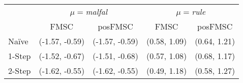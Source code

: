 \begin{tabular}{lcccc} 
 \hline \hline 
 & \multicolumn{2}{c}{\emph{$\mu=$malfal}} & \multicolumn{2}{c}{$\mu=$\emph{rule}}\\ 
 & FMSC & posFMSC & FMSC & posFMSC\\ 
 \hline 
Na\"{i}ve & (-1.57, -0.59) & (-1.57, -0.59) & (0.58, 1.09) & (0.64, 1.21) \\ 
 1-Step & (-1.52, -0.67) & (-1.51, -0.68) & (0.57, 1.08) & (0.68, 1.17) \\ 
 2-Step & (-1.62, -0.55) & (-1.62, -0.55) & (0.49, 1.18) & (0.58, 1.27)\\ 
 \hline 
\end{tabular}